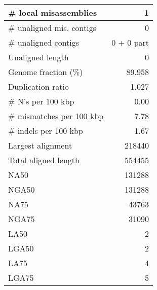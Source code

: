 \documentclass[12pt,a4paper]{article}
\begin{document}
\begin{table}[ht]
\begin{center}
\begin{tabular}{|l*{1}{|r}|}
\# local misassemblies & 1 \\ \hline
\# unaligned mis. contigs & 0 \\ \hline
\# unaligned contigs & 0 + 0 part \\ \hline
Unaligned length & 0 \\ \hline
Genome fraction (\%) & 89.958 \\ \hline
Duplication ratio & 1.027 \\ \hline
\# N's per 100 kbp & 0.00 \\ \hline
\# mismatches per 100 kbp & 7.78 \\ \hline
\# indels per 100 kbp & 1.67 \\ \hline
Largest alignment & 218440 \\ \hline
Total aligned length & 554455 \\ \hline
NA50 & 131288 \\ \hline
NGA50 & 131288 \\ \hline
NA75 & 43763 \\ \hline
NGA75 & 31090 \\ \hline
LA50 & 2 \\ \hline
LGA50 & 2 \\ \hline
LA75 & 4 \\ \hline
LGA75 & 5 \\ \hline
\end{tabular}
\end{center}
\end{table}
\end{document}
